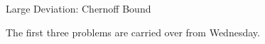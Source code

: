 \documentclass[handout]{mcs}
\begin{document}

\begin{staffnotes}
Large Deviation: Chernoff Bound
\end{staffnotes}


The first three problems are carried over from Wednesday.




\end{document}
